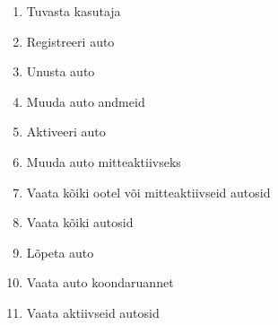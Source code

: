 \begin{enumerate}
\item Tuvasta kasutaja
\item  Registreeri auto
\item  Unusta auto
\item  Muuda auto andmeid
\item  Aktiveeri auto
\item  Muuda auto mitteaktiivseks
\item  Vaata kõiki ootel või mitteaktiivseid autosid
\item  Vaata kõiki autosid
\item  Lõpeta auto
\item  Vaata auto koondaruannet
\item  Vaata aktiivseid autosid
\end{enumerate}
